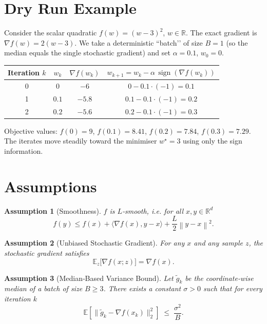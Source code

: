\documentclass{article}
\newtheorem{assumption}{Assumption}
\newcommand{\sign}{\operatorname{sign}}
\newcommand{\EE}{\mathbb{E}}
\newcommand{\RR}{\mathbb{R}}
\newcommand{\norm}[1]{\left\lVert#1\right\rVert}
\begin{document}
\section*{Dry Run Example}
Consider the scalar quadratic $f(w)=(w-3)^{2}$, $w\in\RR$.  
The exact gradient is $\nabla f(w)=2(w-3)$.  
We take a deterministic “batch’’ of size $B=1$ (so the median equals the single stochastic gradient) and set $\alpha=0.1$, $w_{0}=0$.

\begin{center}
\begin{tabular}{c|c|c|c}
Iteration $k$ & $w_{k}$ & $\nabla f(w_{k})$ & $w_{k+1}=w_{k}-\alpha\,\sign(\nabla f(w_{k}))$\\ \hline
0 & $0$ & $-6$ & $0-0.1\cdot(-1)=0.1$\\[2mm]
1 & $0.1$ & $-5.8$ & $0.1-0.1\cdot(-1)=0.2$\\[2mm]
2 & $0.2$ & $-5.6$ & $0.2-0.1\cdot(-1)=0.3$\\[2mm]
\end{tabular}
\end{center}
Objective values:
$f(0)=9$, $f(0.1)=8.41$, $f(0.2)=7.84$, $f(0.3)=7.29$.  
The iterates move steadily toward the minimiser $w^{\star}=3$ using only the sign information.

\newpage

\section*{Assumptions}
\begin{assumption}[Smoothness]\label{as:smooth}
$f$ is $L$‑smooth, i.e. for all $x,y\in\RR^{d}$
\[
f(y)\le f(x)+\langle \nabla f(x),y-x\rangle+\frac{L}{2}\norm{y-x}^{2}.
\tag{A1}
\]
\end{assumption}

\begin{assumption}[Unbiased Stochastic Gradient]\label{as:unbiased}
For any $x$ and any sample $z$, the stochastic gradient satisfies
\[
\EE_{z}\bigl[\nabla f(x;z)\bigr]=\nabla f(x).
\tag{A2}
\]
\end{assumption}

\begin{assumption}[Median‑Based Variance Bound]\label{as:median}
Let $\tilde g_{k}$ be the coordinate‑wise median of a batch of size $B\ge 3$.
There exists a constant $\sigma>0$ such that for every iteration $k$
\[
\EE\!\left[\bigl\|\tilde g_{k}-\nabla f(x_{k})\bigr\|_{2}^{2}\right]
\;\le\; \frac{\sigma^{2}}{B}.
\tag{A3}
\]
\end{assumption}
\end{document}
